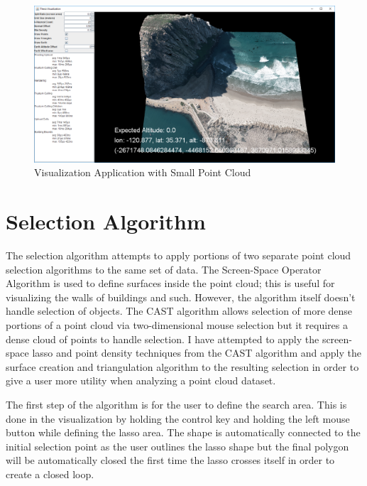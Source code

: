 \begin{figure}[htp]
\begin{center}
  \includegraphics[width=.9\linewidth]{images/visualization.png}
  \caption{Visualization Application with Small Point Cloud}
  \label{fig:visualization}
\end{center}
\end{figure}

\section{Selection Algorithm}

The selection algorithm attempts to apply portions of two separate point cloud
selection algorithms to the same set of data. The Screen-Space Operator
Algorithm \cite{1_VAST:VAST11:105-112} is used to define surfaces inside the
point cloud; this is useful for visualizing the walls of buildings and such.
However, the algorithm itself doesn't handle selection of objects. The CAST
algorithm \cite{2_yu:hal-01178051} allows selection of more dense portions of a
point cloud via two-dimensional mouse selection but it requires a dense cloud of
points to handle selection. I have attempted to apply the screen-space lasso and
point density techniques from the CAST algorithm and apply the surface creation
and triangulation algorithm to the resulting selection in order to give a user
more utility when analyzing a point cloud dataset.

The first step of the algorithm is for the user to define the search area. This
is done in the visualization by holding the control key and holding the left
mouse button while defining the lasso area. The shape is automatically connected
to the initial selection point as the user outlines the lasso shape but the
final polygon will be automatically closed the first time the lasso crosses
itself in order to create a closed loop.

